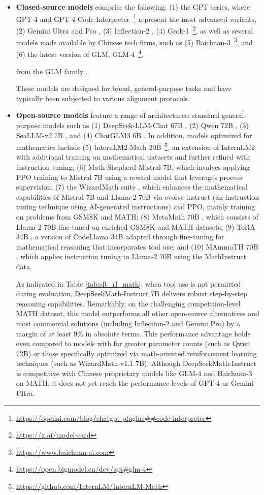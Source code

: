 \begin{itemize}[topsep=0pt]
\begin{itemize}[topsep=0pt]
    \item \textbf{Closed-source models} comprise the following: (1) the GPT series, where GPT-4 \citep{gpt4} and GPT-4 Code Interpreter~\footnote{\url{https://openai.com/blog/chatgpt-plugins\#\#code-interpreter}} represent the most advanced variants, (2) Gemini Ultra and Pro \citep{gemini}, (3) Inflection-2 \citep{inflection-2}, (4) Grok-1~\footnote{\url{https://x.ai/model-card}}, as well as several models made available by Chinese tech firms, such as (5) Baichuan-3~\footnote{\url{https://www.baichuan-ai.com}}, and (6) the latest version of GLM, GLM-4~\footnote{\url{https://open.bigmodel.cn/dev/api\#glm-4}}.

    from the GLM family \citep{glm}.

These models are designed for broad, general-purpose tasks and have typically been subjected to various alignment protocols. 

\item \textbf{Open-source models} feature a range of architectures: standard general-purpose models such as (1) DeepSeek-LLM-Chat 67B \citep{deepseek-llm}, (2) Qwen 72B \citep{qwen}, (3) SeaLLM-v2 7B \citep{seallm}, and (4) ChatGLM3 6B \citep{chatglm3}. In addition, models optimized for mathematics include (5) InternLM2-Math 20B~\footnote{\url{https://github.com/InternLM/InternLM-Math}}, an extension of InternLM2 with additional training on mathematical datasets and further refined with instruction tuning; (6) Math-Shepherd-Mistral 7B, which involves applying PPO training \citep{schulman2017proximal} to Mistral 7B \citep{mistral} using a reward model that leverages process supervision; (7) the WizardMath suite \citep{wizardmath}, which enhances the mathematical capabilities of Mistral 7B and Llama-2 70B \citep{llama2} via evolve-instruct (an instruction tuning technique using AI-generated instructions) and PPO, mainly training on problems from GSM8K and MATH; (8) MetaMath 70B \citep{metamath}, which consists of Llama-2 70B fine-tuned on enriched GSM8K and MATH datasets; (9) ToRA 34B \cite{tora}, a version of CodeLlama 34B adapted through fine-tuning for mathematical reasoning that incorporates tool use; and (10) MAmmoTH 70B \citep{MathInstruct}, which applies instruction tuning to Llama-2 70B using the MathInstruct data.

As indicated in Table \ref{tab:sft_rl_math}, when tool use is not permitted during evaluation, DeepSeekMath-Instruct 7B delivers robust step-by-step reasoning capabilities. Remarkably, on the challenging competition-level MATH dataset, this model outperforms all other open-source alternatives and most commercial solutions (including Inflection-2 and Gemini Pro) by a margin of at least 9\% in absolute terms. This performance advantage holds even compared to models with far greater parameter counts (such as Qwen 72B) or those specifically optimized via math-oriented reinforcement learning techniques (such as WizardMath-v1.1 7B). Although DeepSeekMath-Instruct is competitive with Chinese proprietary models like GLM-4 and Baichuan-3 on MATH, it does not yet reach the performance levels of GPT-4 or Gemini Ultra.


\end{itemize}
\end{itemize}
